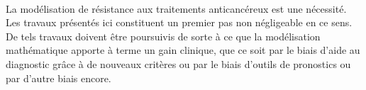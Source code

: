 \documentclass[main.tex]{subfiles}
\begin{document}
\paragraph{}
La modélisation de résistance aux traitements anticancéreux est une nécessité. Les travaux présentés ici constituent un premier pas non négligeable en ce sens. 
De tels travaux doivent être poursuivis de sorte à ce que la modélisation mathématique apporte à terme un gain clinique, que ce soit par le biais d'aide au diagnostic grâce à de nouveaux critères ou par le biais d'outils de pronostics ou par d'autre biais encore.
\end{document}
